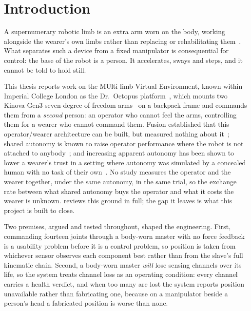 \chapter{Introduction}
\label{ch:intro}

A supernumerary robotic limb is an extra arm worn on the body, working
alongside the wearer's own limbs rather than replacing or rehabilitating
them~\cite{yang2021srlreview,prattichizzo2021augmentation}. What separates
such a device from a fixed manipulator is consequential for control: the base
of the robot is a person. It accelerates, sways and steps, and it cannot be
told to hold still.

This thesis reports work on the MUlti-limb Virtual Environment, known within
Imperial College London as the Dr.\ Octopus platform~\cite{muve}, which mounts
two Kinova Gen3 seven-degree-of-freedom arms~\cite{kinova2022gen3} on a
backpack frame and commands them from a \emph{second} person: an operator who
cannot feel the arms, controlling them for a wearer who cannot command them.
Fusion established that this operator/wearer architecture can be built, but
measured nothing about it~\cite{saraiji2018fusion}; shared autonomy is known
to raise operator performance where the robot is not attached to
anybody~\cite{dragan2013policyblending,javdani2015hindsight}; and increasing
apparent autonomy has been shown to lower a wearer's trust in a setting where
autonomy was simulated by a concealed human with no task of their
own~\cite{zhou2026proxemics}. No study measures the operator and the wearer
together, under the same autonomy, in the same trial, so the exchange rate
between what shared autonomy buys the operator and what it costs the wearer
is unknown.  reviews this ground in full; the gap it
leaves is what this project is built to close.

Two premises, argued and tested throughout, shaped the engineering. First,
commanding fourteen joints through a body-worn master with no force feedback
is a usability problem before it is a control problem, so position is taken
from whichever sensor observes each component best rather than from the
slave's full kinematic chain. Second, a body-worn master \emph{will} lose
sensing channels over its life, so the system treats channel loss as an
operating condition: every channel carries a health verdict, and when too
many are lost the system reports position unavailable rather than fabricating
one, because on a manipulator beside a person's head a fabricated position is
worse than none.

